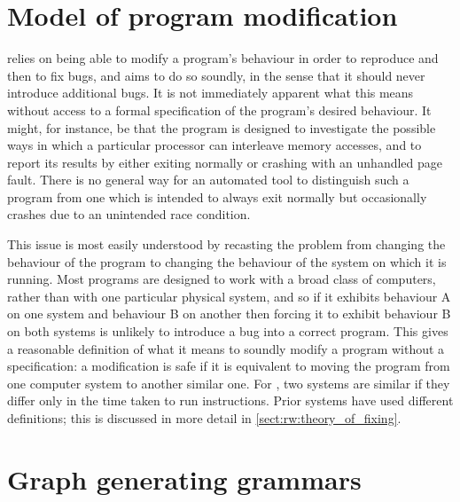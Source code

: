\section{Model of program modification}

{\Technique} relies on being able to modify a program's behaviour in
order to reproduce and then to fix bugs, and aims to do so soundly, in
the sense that it should never introduce additional bugs.  It is not
immediately apparent what this means without access to a formal
specification of the program's desired behaviour.  It might, for
instance, be that the program is designed to investigate the possible
ways in which a particular processor can interleave memory accesses,
and to report its results by either exiting normally or crashing with
an unhandled page fault.  There is no general way for an automated
tool to distinguish such a program from one which is intended to
always exit normally but occasionally crashes due to an unintended
race condition.

This issue is most easily understood by recasting the problem from
changing the behaviour of the program to changing the behaviour of the
system on which it is running.  Most programs are designed to work
with a broad class of computers, rather than with one particular
physical system, and so if it exhibits behaviour A on one system and
behaviour B on another then forcing it to exhibit behaviour B on both
systems is unlikely to introduce a bug into a correct program.  This
gives a reasonable definition of what it means to soundly modify a
program without a specification: a modification is safe if it is
equivalent to moving the program from one computer system to another
similar one.  For {\technique}, two systems are similar if they differ
only in the time taken to run instructions.  Prior systems have used
different definitions; this is discussed in more detail in
\autoref{sect:rw:theory_of_fixing}.

\section{Graph generating grammars}


